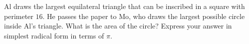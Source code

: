 Al draws the largest equilateral triangle that can be inscribed in a square with perimeter \(16\). He passes the paper to Mo, who draws the largest possible circle inside Al's triangle. What is the area of the circle? Express your answer in simplest radical form in terms of \(\pi\).
